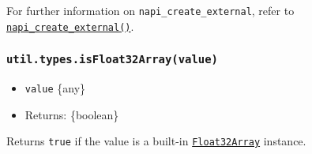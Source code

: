 \begin{Shaded}
\begin{Highlighting}[]
\OperatorTok{=} \NormalTok{(}\NormalTok{)}\OperatorTok{;}
\OperatorTok{=}\NormalTok{()}\OperatorTok{;}
\OperatorTok{;} 
\NormalTok{(}\NormalTok{)}\OperatorTok{;} 
\NormalTok{(} \NormalTok{(}\NormalTok{))}\OperatorTok{;} 
\end{Highlighting}
\end{Shaded}

For further information on \texttt{napi\_create\_external}, refer to
\href{n-api.md\#napi_create_external}{\texttt{napi\_create\_external()}}.

\subsubsection{\texorpdfstring{\texttt{util.types.isFloat32Array(value)}}{util.types.isFloat32Array(value)}}\label{util.types.isfloat32arrayvalue}

\begin{itemize}
\tightlist
\item
  \texttt{value} \{any\}
\item
  Returns: \{boolean\}
\end{itemize}

Returns \texttt{true} if the value is a built-in
\href{https://developer.mozilla.org/en-US/docs/Web/JavaScript/Reference/Global_Objects/Float32Array}{\texttt{Float32Array}}
instance.

\begin{Shaded}
\begin{Highlighting}[]
\NormalTok{(} \NormalTok{())}\OperatorTok{;}  
\NormalTok{(} \NormalTok{())}\OperatorTok{;}  
\NormalTok{(} \NormalTok{())}\OperatorTok{;}  
\end{Highlighting}
\end{Shaded}

